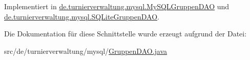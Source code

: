 Implementiert in \hyperlink{classde_1_1turnierverwaltung_1_1mysql_1_1_my_s_q_l_gruppen_d_a_o_ae2123eedba71efda38d2f2700d098c32}{de.\+turnierverwaltung.\+mysql.\+My\+S\+Q\+L\+Gruppen\+D\+AO} und \hyperlink{classde_1_1turnierverwaltung_1_1mysql_1_1_s_q_lite_gruppen_d_a_o_aa1640b18e1708c3b817a939e76c0d052}{de.\+turnierverwaltung.\+mysql.\+S\+Q\+Lite\+Gruppen\+D\+AO}.



Die Dokumentation für diese Schnittstelle wurde erzeugt aufgrund der Datei\+:\begin{DoxyCompactItemize}
\item 
src/de/turnierverwaltung/mysql/\hyperlink{_gruppen_d_a_o_8java}{Gruppen\+D\+A\+O.\+java}\end{DoxyCompactItemize}
